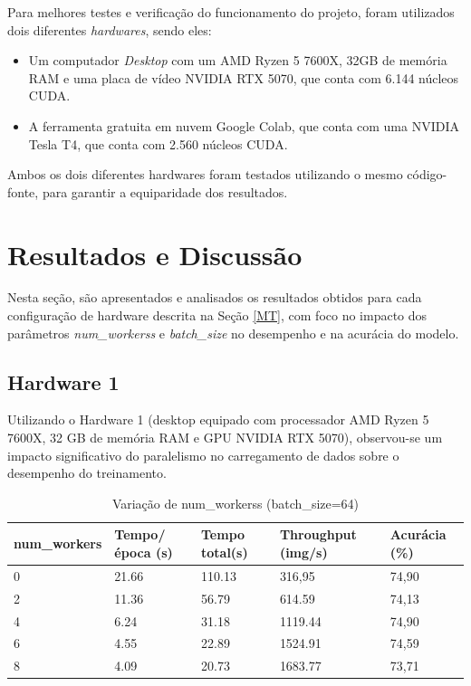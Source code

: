 \documentclass[a4paper,11pt]{article}
\begin{document}
Para melhores testes e verificação do funcionamento do projeto, foram utilizados dois diferentes \textit{hardwares}, sendo eles: 
\begin{itemize}
    \item Um computador \textit{Desktop} com um AMD Ryzen 5 7600X, 32GB de memória RAM e uma placa de vídeo NVIDIA RTX 5070, que conta com 6.144 núcleos CUDA.
    \item A ferramenta gratuita em nuvem Google Colab, que conta com uma NVIDIA Tesla T4, que conta com 2.560 núcleos CUDA.
\end{itemize}

Ambos os dois diferentes hardwares foram testados utilizando o mesmo código-fonte, para garantir a equiparidade dos resultados.

\section{Resultados e Discussão}

Nesta seção, são apresentados e analisados os resultados obtidos para cada configuração de hardware descrita na Seção \ref{MT}, com foco no impacto dos parâmetros \textit{num\_workerss} e \textit{batch\_size} no desempenho e na acurácia do modelo.


\subsection{Hardware 1}

Utilizando o Hardware 1 (desktop equipado com processador AMD Ryzen 5 7600X, 32 GB de memória RAM e GPU NVIDIA RTX 5070), observou-se um impacto significativo do paralelismo no carregamento de dados sobre o desempenho do treinamento.

\begin{table}[H]
\centering
\begin{tabular}{|l|l|l|l|l|}
\hline
num\_workers & Tempo/época (s) & Tempo total(s) & Throughput (img/s) & Acurácia (\%) \\ \hline
0           &  21.66          &     110.13     &    316,95          &   74,90      \\ \hline
2           &  11.36          &     56.79      &    614.59          &   74,13      \\ \hline
4           &  6.24           &     31.18      &    1119.44         &   74,90      \\ \hline
6           &  4.55           &     22.89      &    1524.91         &   74,59      \\ \hline
8           &  4.09           &     20.73      &    1683.77         &   73,71     \\ \hline
\end{tabular}
\caption{Variação de num\_workerss (batch\_size=64)}
\label{tab:num_workers_e}
\end{table}
\end{document}
